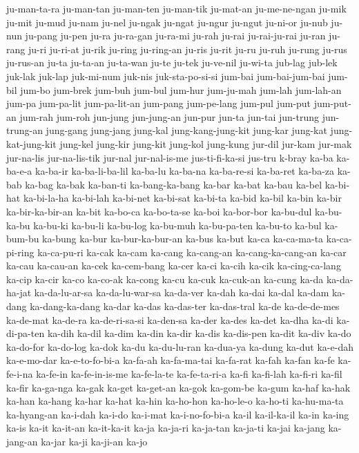 {ju-man-ta-ra ju-man-tan ju-man-ten ju-man-tik ju-mat-an ju-me-ne-ngan
ju-mik ju-mit ju-mud ju-nam ju-nel ju-ngak ju-ngat ju-ngur ju-ngut
ju-ni-or ju-nub ju-nun ju-pang ju-pen ju-ra ju-ra-gan ju-ra-mi ju-rah
ju-rai ju-rai-ju-rai ju-ran ju-rang ju-ri ju-ri-at ju-rik ju-ring
ju-ring-an ju-ris ju-rit ju-ru ju-ruh ju-rung ju-rus ju-rus-an ju-ta
ju-ta-an ju-ta-wan ju-te ju-tek ju-ve-nil ju-wi-ta jub-lag jub-lek juk-lak
juk-lap juk-mi-num juk-nis juk-sta-po-si-si jum-bai jum-bai-jum-bai
jum-bil jum-bo jum-brek jum-buh jum-bul jum-hur jum-ju-mah jum-lah
jum-lah-an jum-pa jum-pa-lit jum-pa-lit-an jum-pang jum-pe-lang jum-pul
jum-put jum-put-an jum-rah jum-roh jun-jung jun-jung-an jun-pur jun-ta
jun-tai jun-trung jun-trung-an jung-gang jung-jang jung-kal
jung-kang-jung-kit jung-kar jung-kat jung-kat-jung-kit jung-kel jung-kir
jung-kit jung-kol jung-kung jur-dil jur-kam jur-mak jur-na-lis
jur-na-lis-tik jur-nal jur-nal-is-me jus-ti-fi-ka-si jus-tru k-bray ka-ba
ka-ba-e-a ka-ba-ir ka-ba-li-ba-lil ka-ba-lu ka-ba-na ka-ba-re-si ka-ba-ret
ka-ba-za ka-bab ka-bag ka-bak ka-ban-ti ka-bang-ka-bang ka-bar ka-bat
ka-bau ka-bel ka-bi-hat ka-bi-la-ha ka-bi-lah ka-bi-net ka-bi-sat ka-bi-ta
ka-bid ka-bil ka-bin ka-bir ka-bir-ka-bir-an ka-bit ka-bo-ca ka-bo-ta-se
ka-boi ka-bor-bor ka-bu-dul ka-bu-ka-bu ka-bu-ki ka-bu-li ka-bu-log
ka-bu-muh ka-bu-pa-ten ka-bu-to ka-bul ka-bum-bu ka-bung ka-bur
ka-bur-ka-bur-an ka-bus ka-but ka-ca ka-ca-ma-ta ka-ca-pi-ring ka-ca-pu-ri
ka-cak ka-cam ka-cang ka-cang-an ka-cang-ka-cang-an ka-car ka-cau
ka-cau-an ka-cek ka-cem-bang ka-cer ka-ci ka-cih ka-cik ka-cing-ca-lang
ka-cip ka-cir ka-co ka-co-ak ka-cong ka-cu ka-cuk ka-cuk-an ka-cung ka-da
ka-da-ha-jat ka-da-lu-ar-sa ka-da-lu-war-sa ka-da-ver ka-dah ka-dai ka-dal
ka-dam ka-dang ka-dang-ka-dang ka-dar ka-das ka-das-ter ka-das-tral ka-de
ka-de-de-mes ka-de-mat ka-de-ra ka-de-ri-sa-si ka-den-sa ka-der ka-des
ka-det ka-dha ka-di ka-di-pa-ten ka-dih ka-dil ka-dim ka-din ka-dir ka-dis
ka-dis-pen ka-dit ka-div ka-do ka-do-for ka-do-log ka-dok ka-du
ka-du-lu-ran ka-dua-ya ka-dung ka-dut ka-e-dah ka-e-mo-dar ka-e-to-fo-bi-a
ka-fa-ah ka-fa-ma-tai ka-fa-rat ka-fah ka-fan ka-fe ka-fe-i-na ka-fe-in
ka-fe-in-is-me ka-fe-la-te ka-fe-ta-ri-a ka-fi ka-fi-lah ka-fi-ri ka-fil
ka-fir ka-ga-nga ka-gak ka-get ka-get-an ka-gok ka-gom-be ka-gum ka-haf
ka-hak ka-han ka-hang ka-har ka-hat ka-hin ka-ho-hon ka-ho-le-o ka-ho-ti
ka-hu-ma-ta ka-hyang-an ka-i-dah ka-i-do ka-i-mat ka-i-no-fo-bi-a ka-il
ka-il-ka-il ka-in ka-ing ka-is ka-it ka-it-an ka-it-ka-it ka-ja ka-ja-ri
ka-ja-tan ka-ja-ti ka-jai ka-jang ka-jang-an ka-jar ka-ji ka-ji-an ka-jo
}

